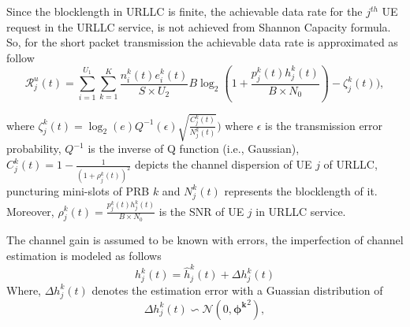 \documentclass[conference]{IEEEtran}
\begin{document}
Since the blocklength in URLLC is finite, the achievable data rate for the $j^{th}$ UE request in the URLLC service, is not achieved from Shannon Capacity formula. So, for the short packet transmission the achievable data rate is approximated as follow
\begin{equation}\label{eq11}
\mathcal{R}_{j}^u(t) = \sum_{i = 1}^{U_1}\sum_{k=1}^K \frac{n^k_i(t)e^k_i(t)}{S \times U_2} B \log_2({1+\frac{p^k_j(t)h^k_j(t)}{B \times N_0}})- \zeta_{j}^k(t)), 
\end{equation}

where $\zeta_{j}^k(t) = \log_2({e})Q^{-1}(\epsilon) \sqrt{\frac{C_{j}^k(t)}{N_{j}^k(t)}})$
where $\epsilon$ is the transmission error probability, $Q^{-1}$ is the inverse of Q function (i.e., Gaussian),
$C_{j}^k(t) = 1 - \frac{1}{(1+\rho_{j}^k(t))^2}$ depicts the channel dispersion of UE $j$ of URLLC, puncturing mini-slots of PRB $k$ and
$N_{j}^k(t)$ represents the blocklength of it. Moreover, $\rho_{j}^k(t)=\frac{p^k_j(t)h^k_j(t)}{B \times N_0}$ is the SNR of UE $j$ in URLLC service. 

The channel gain is assumed to be known with errors, the imperfection of channel estimation is
modeled as follows
\begin{equation}
h^k_j(t) = \hat{h}^k_j(t) + \Delta h^k_j(t)
\end{equation}
Where, $\Delta h^k_j(t)$ denotes the estimation error with a Guassian distribution of
 \begin{equation}
\Delta h^k_j(t)\backsim \mathcal{N}(0,\boldsymbol{\phi^k}^2),
\end{equation}
\end{document}
